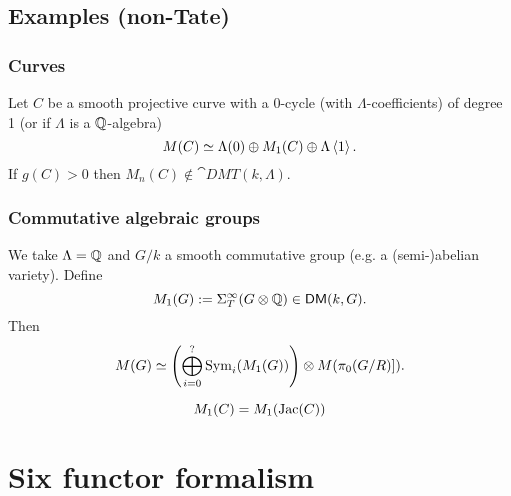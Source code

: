 \subsection{Examples (non-Tate)}
\subsubsection{Curves}
\begin{proposition}
Let $C$ be a smooth projective curve with a 0-cycle (with $\Lambda$-coefficients) of
degree 1 (or if $\Lambda$ is a $\mathbb Q$-algebra)
\[
M(C) \simeq \Lambda(0) \oplus M_1(C) \oplus \Lambda \left<1 \right>.
\]
If $g(C)>0$ then $M_n(C)\not\in \cat{DMT}(k,\Lambda)$.
\end{proposition}
\subsubsection{Commutative algebraic groups}
\begin{theorem}[?]
We take $\Lambda=\mathbb Q$ and $G /k$ a smooth commutative group (e.g. a (semi-)abelian variety). Define
\[
M_1(G) := \Sigma_T^{\infty}(G\otimes \mathbb Q) \in \mathsf{DM}(k,G).
\]
Then
\[
M(G) \isoto \left( \bigoplus_{i=0}^{?}\Sym_i(M_1(G)) \right) \otimes M(\pi_0(G/R)]). %
\]
\end{theorem}

\begin{example}
\[ M_1(C)=M_1(\operatorname{Jac}(C)) \]
\end{example}

\section{Six functor formalism}
